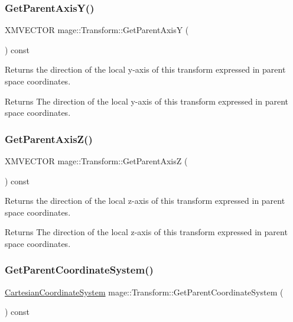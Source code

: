 \subsubsection{\texorpdfstring{Get\+Parent\+Axis\+Y()}{GetParentAxisY()}}
{\footnotesize\ttfamily X\+M\+V\+E\+C\+T\+OR mage\+::\+Transform\+::\+Get\+Parent\+AxisY (\begin{DoxyParamCaption}{ }\end{DoxyParamCaption}) const}

Returns the direction of the local y-\/axis of this transform expressed in parent space coordinates.

\begin{DoxyReturn}{Returns}
The direction of the local y-\/axis of this transform expressed in parent space coordinates. 
\end{DoxyReturn}
\hypertarget{structmage_1_1_transform_a6b8002971da0bd9acbbd865c7325c860}{}\label{structmage_1_1_transform_a6b8002971da0bd9acbbd865c7325c860} 
\subsubsection{\texorpdfstring{Get\+Parent\+Axis\+Z()}{GetParentAxisZ()}}
{\footnotesize\ttfamily X\+M\+V\+E\+C\+T\+OR mage\+::\+Transform\+::\+Get\+Parent\+AxisZ (\begin{DoxyParamCaption}{ }\end{DoxyParamCaption}) const}

Returns the direction of the local z-\/axis of this transform expressed in parent space coordinates.

\begin{DoxyReturn}{Returns}
The direction of the local z-\/axis of this transform expressed in parent space coordinates. 
\end{DoxyReturn}
\hypertarget{structmage_1_1_transform_a3d6f03cda826eaf99a2d39e5c900fcbe}{}\label{structmage_1_1_transform_a3d6f03cda826eaf99a2d39e5c900fcbe} 
\subsubsection{\texorpdfstring{Get\+Parent\+Coordinate\+System()}{GetParentCoordinateSystem()}}
{\footnotesize\ttfamily \hyperlink{structmage_1_1_cartesian_coordinate_system}{Cartesian\+Coordinate\+System} mage\+::\+Transform\+::\+Get\+Parent\+Coordinate\+System (\begin{DoxyParamCaption}{ }\end{DoxyParamCaption}) const}

